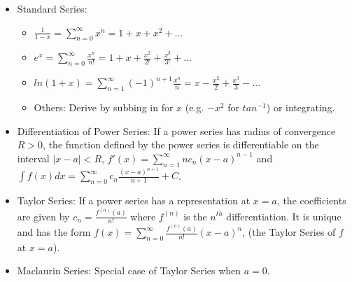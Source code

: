 \documentclass[10pt, portrait]{article}
\begin{document}
\begin{multicols*}{2}
\begin{itemize}
\begin{itemize}
    \end{itemize}
    \item Standard Series:
    \begin{itemize}
        \item $\frac{1}{1-x} = \sum_{n=0}^\infty x^n=1+x+x^2+...$
        \item $e^x=\sum_{n=0}^\infty \frac{x^n}{n!}=1+x+\frac{x^2}{2!}+\frac{x^3}{3!}+...$
        \item $ln(1+x)=\sum_{n=1}^\infty (-1)^{n+1}\frac{x^n}{n}=x-\frac{x^2}{2}+\frac{x^3}{3}-...$
        \item Others: Derive by subbing in for $x$ (e.g. $-x^2$ for $tan^{-1}$) or integrating.
    \end{itemize}
    \item Differentiation of Power Series: If a power series has radius of convergence $R>0$, the function defined by the power series is differentiable on the interval $|x-a|<R$, $f'(x)=\sum_{n=1}^\infty nc_n(x-a)^{n-1}$ and $\int f(x)dx=\sum_{n=0}^\infty c_n\frac{(x-a)^{n+1}}{n+1}+C$.
    \item Taylor Series: If a power series has a representation at $x=a$, the coefficients are given by $c_n=\frac{f^{(n)}(a)}{n!}$ where $f^{(n)}$ is the $n^{th}$ differentiation. It is unique and has the form $f(x)=\sum_{n=0}^\infty \frac{f^{(n)}(a)}{n!}(x-a)^n$, (the Taylor Series of $f$ at $x=a$).
    \item Maclaurin Series: Special case of Taylor Series when $a=0$.
\end{itemize}


\end{multicols*}
\end{document}
